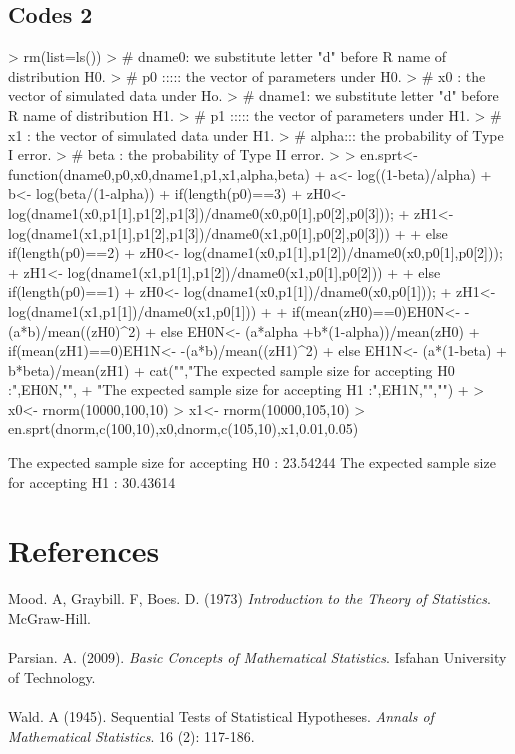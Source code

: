 \documentclass{article}
\begin{document}
\subsection{Codes 2}
\begin{Schunk}
\begin{Sinput}
> rm(list=ls())
> # dname0: we substitute letter "d" before R name of distribution H0.
> # p0 ::::: the vector of parameters under H0.
> # x0     : the vector of simulated data under Ho.
> # dname1: we substitute letter "d" before R name of distribution H1.
> # p1 ::::: the vector of parameters under H1.
> # x1     : the vector of simulated data under H1.
> # alpha::: the probability of Type I error.
> # beta   : the probability of Type II error.
> 
> en.sprt<- function(dname0,p0,x0,dname1,p1,x1,alpha,beta){
+   a<-   log((1-beta)/alpha)
+   b<-   log(beta/(1-alpha))
+   if(length(p0)==3){
+     zH0<- log(dname1(x0,p1[1],p1[2],p1[3])/dname0(x0,p0[1],p0[2],p0[3]));
+     zH1<- log(dname1(x1,p1[1],p1[2],p1[3])/dname0(x1,p0[1],p0[2],p0[3]))}
+   
+   else if(length(p0)==2){
+     zH0<- log(dname1(x0,p1[1],p1[2])/dname0(x0,p0[1],p0[2]));
+     zH1<- log(dname1(x1,p1[1],p1[2])/dname0(x1,p0[1],p0[2]))}
+   
+   else if(length(p0)==1){
+     zH0<- log(dname1(x0,p1[1])/dname0(x0,p0[1]));
+     zH1<- log(dname1(x1,p1[1])/dname0(x1,p0[1]))}
+   
+   if(mean(zH0)==0)EH0N<- -(a*b)/mean((zH0)^2)
+   else EH0N<- (a*alpha +b*(1-alpha))/mean(zH0)
+   if(mean(zH1)==0)EH1N<- -(a*b)/mean((zH1)^2)
+   else EH1N<- (a*(1-beta) + b*beta)/mean(zH1)
+   cat("\n","The expected sample size for accepting H0 :",EH0N,"\n",
+       "The expected sample size for accepting H1 :",EH1N,"\n","\n")
+ }
> x0<- rnorm(10000,100,10)
> x1<- rnorm(10000,105,10)
> en.sprt(dnorm,c(100,10),x0,dnorm,c(105,10),x1,0.01,0.05)
\end{Sinput}
\begin{Soutput}
 The expected sample size for accepting H0 : 23.54244 
 The expected sample size for accepting H1 : 30.43614 
\end{Soutput}
\end{Schunk}
\newpage
\section{References}
Mood. A, Graybill. F, Boes. D. (1973) {\it Introduction to the Theory of Statistics}. McGraw-Hill.\\\\
Parsian. A. (2009). {\it Basic Concepts of Mathematical Statistics}. Isfahan University of Technology.\\\\
Wald. A (1945). Sequential Tests of Statistical Hypotheses. {\it Annals of Mathematical Statistics}. 16 (2): 117-186.\\\\
\end{document}
